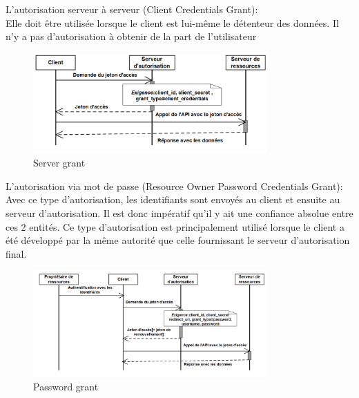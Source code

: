 \begin{list}{•}
	\item L’autorisation serveur à serveur (Client Credentials Grant):\\
	 Elle doit être utilisée lorsque le client est lui-même le détenteur des données. Il n’y a pas d’autorisation à obtenir de la part de l’utilisateur
	 \begin{figure}[!th]
            \centering
                \includegraphics[width=0.8\textwidth]{Figures/server_server}
	       \decoRule
		\caption[Sever grant]{Server grant}
	\label{fig:Server}
	\end{figure}
	
	 \item L’autorisation via mot de passe (Resource Owner Password Credentials Grant):\\
	 Avec ce type d’autorisation, les identifiants sont envoyés au client et ensuite au serveur d’autorisation. Il est donc
	 impératif qu’il y ait une confiance absolue entre ces 2 entités. Ce type d’autorisation est principalement utilisé lorsque le client a été développé par la même autorité que celle          fournissant le serveur d’autorisation final.
	 \begin{figure}[!th]
            \centering
                \includegraphics[width=0.8\textwidth]{Figures/password_grant}
	       \decoRule
		\caption[Password grant]{Password grant}
	\label{fig:Password}
	\end{figure}
\end{list}



